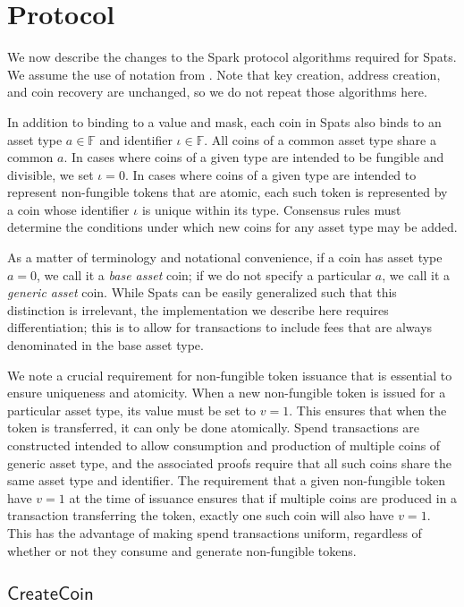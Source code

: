 \documentclass{article}
\newcommand{\F}{\mathbb{F}}
\newcommand{\func}[1]{\mathsf{#1}}
\begin{document}
\section{Protocol}

We now describe the changes to the Spark protocol algorithms required for Spats.
We assume the use of notation from \cite{spark}.
Note that key creation, address creation, and coin recovery are unchanged, so we do not repeat those algorithms here.

In addition to binding to a value and mask, each coin in Spats also binds to an asset type $a \in \F$ and identifier $\iota \in \F$.
All coins of a common asset type share a common $a$.
In cases where coins of a given type are intended to be fungible and divisible, we set $\iota = 0$.
In cases where coins of a given type are intended to represent non-fungible tokens that are atomic, each such token is represented by a coin whose identifier $\iota$ is unique within its type.
Consensus rules must determine the conditions under which new coins for any asset type may be added.

As a matter of terminology and notational convenience, if a coin has asset type $a = 0$, we call it a \textit{base asset} coin; if we do not specify a particular $a$, we call it a \textit{generic asset} coin.
While Spats can be easily generalized such that this distinction is irrelevant, the implementation we describe here requires differentiation; this is to allow for transactions to include fees that are always denominated in the base asset type.

We note a crucial requirement for non-fungible token issuance that is essential to ensure uniqueness and atomicity.
When a new non-fungible token is issued for a particular asset type, its value must be set to $v = 1$.
This ensures that when the token is transferred, it can only be done atomically.
Spend transactions are constructed intended to allow consumption and production of multiple coins of generic asset type, and the associated proofs require that all such coins share the same asset type and identifier.
The requirement that a given non-fungible token have $v = 1$ at the time of issuance ensures that if multiple coins are produced in a transaction transferring the token, exactly one such coin will also have $v = 1$.
This has the advantage of making spend transactions uniform, regardless of whether or not they consume and generate non-fungible tokens.


\subsection{\texorpdfstring{$\func{CreateCoin}$}{CreateCoin}}
\end{document}
